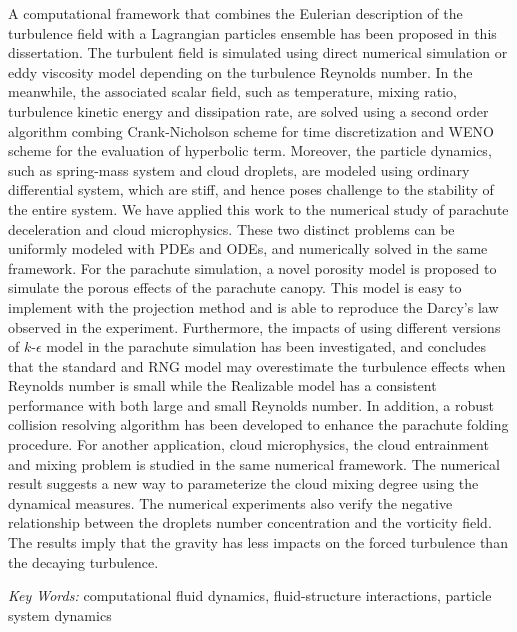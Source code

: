 A computational framework that combines the Eulerian description of the turbulence field with a Lagrangian particles ensemble has been proposed in this dissertation. The turbulent field is simulated using direct numerical simulation or eddy viscosity model depending on the turbulence Reynolds number. In the meanwhile, the associated scalar field, such as temperature, mixing ratio, turbulence kinetic energy and dissipation rate, are solved using a second order algorithm combing Crank-Nicholson scheme for time discretization and WENO scheme for the evaluation of hyperbolic term. Moreover, the particle dynamics, such as spring-mass system and cloud droplets, are modeled using ordinary differential system, which are stiff, and hence poses challenge to the stability of the entire system. We have applied this work to the numerical study of parachute deceleration and cloud microphysics. These two distinct problems can be uniformly modeled with PDEs and ODEs, and numerically solved in the same framework. For the parachute simulation, a novel porosity model is proposed to simulate the porous effects of the parachute canopy. This model is easy to implement with the projection method \cite{Brown2001Accurate} and is able to reproduce the Darcy's law observed in the experiment. Furthermore, the impacts of using different versions of $k$-$\epsilon$ model in the parachute simulation has been investigated, and concludes that the standard and RNG model may overestimate the turbulence effects when Reynolds number is small while the Realizable model has a consistent performance with both large and small Reynolds number. In addition, a robust collision resolving algorithm has been developed to enhance the parachute folding procedure. For another application, cloud microphysics, the cloud entrainment and mixing problem is studied in the same numerical framework. The numerical result suggests a new way to parameterize the cloud mixing degree using the dynamical measures. The numerical experiments also verify the negative relationship between the droplets number concentration and the vorticity field. The results imply that the gravity has less impacts on the forced turbulence than the decaying turbulence.

{\it Key Words:} computational fluid dynamics, fluid-structure interactions, particle system dynamics

